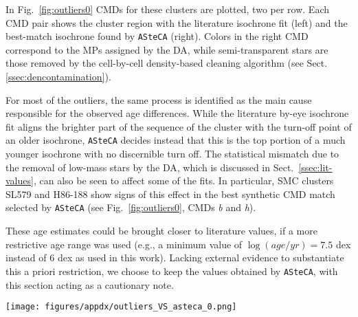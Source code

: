 \documentclass{aa}
\begin{document}
\begin{appendix}
In Fig.~\ref{fig:outliers0} CMDs for these clusters are plotted, two per row.
Each CMD pair shows the cluster region with the literature isochrone fit (left)
and the best-match isochrone found by \texttt{ASteCA} (right).
%
Colors in the right CMD correspond to the MPs assigned by the DA, while
semi-transparent stars are those removed by the cell-by-cell density-based
cleaning algorithm (see Sect.\ref{ssec:dencontamination}).
%

For most of the outliers, the same process is identified as the main
cause responsible for the observed age differences.
While the literature by-eye isochrone fit aligns the brighter
part of the sequence of the cluster with the turn-off point of an older
isochrone, \texttt{ASteCA} decides instead that this is the top portion of a
much younger isochrone with no discernible turn off.
%
The statistical mismatch due to the removal of low-mass stars by the DA,
which is discussed in Sect.~\ref{ssec:lit-values}, can also be seen to affect some
of the fits. In particular, SMC clusters SL579 and H86-188 show signs of
this effect in the best synthetic CMD match selected by \texttt{ASteCA}
(see Fig.~\ref{fig:outliers0}, CMDs \emph{b} and \emph{h}).

These age estimates could be brought closer to literature values, if a more
restrictive age range was used (e.g., a minimum value of $\log(age/yr){=}7.5$
dex instead of 6 dex as used in this work).
Lacking external evidence to substantiate this a priori restriction, we choose
to keep the values obtained by \texttt{ASteCA}, with this section acting as a
cautionary note.

\begin{figure*}
\texttt{[image: figures/appdx/outliers\_VS\_asteca\_0.png]}
\caption{CMDs for the outliers set. Description of the plots in the main
text of the section.}
\label{fig:outliers0}
\end{figure*}






\end{appendix}
\end{document}
